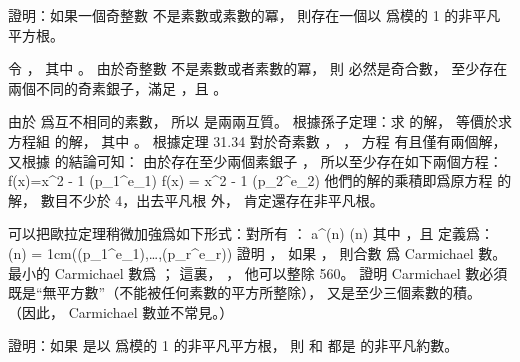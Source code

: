 \startsection[
  title={Primality testing},
]

\startEXERCISE
證明：如果一個奇整數  不是素數或素數的冪，
則存在一個以  爲模的 1 的非平凡平方根。
\stopEXERCISE

\startANSWER
令 ，
其中 。
由於奇整數  不是素數或者素數的冪，
則  必然是奇合數，
至少存在兩個不同的奇素銀子，滿足 ，且 。

由於  爲互不相同的素數，
所以  是兩兩互質。
根據孫子定理：求  的解，
等價於求方程組  的解，
其中 。
根據定理 31.34 對於奇素數 ， ，
方程  有且僅有兩個解，
又根據 的結論可知：
由於存在至少兩個素銀子 ，
所以至少存在如下兩個方程：
\startformula
f(x)=x^2 - 1  (\mod p_1^{e_1})
\stopformula
\startformula
f(x) = x^2 - 1  (\mod p_2^{e_2})
\stopformula
他們的解的乘積即爲原方程  的解，
數目不少於 4，出去平凡根  外，
肯定還存在非平凡根。
\stopANSWER

\startEXERCISE
可以把歐拉定理稍微加強爲如下形式：對所有 ：
\startformula
a^{\lambda(n)}  (\mod n)
\stopformula
其中 ，且  定義爲：
\startformula
\lambda(n) = 1cm(\phi(p_1^{e_1}),\ldots,\phi(p_r^{e_r}))
\stopformula
證明 ，
如果 ，
則合數  爲 Carmichael 數。
最小的 Carmichael 數爲 ；
這裏， ，
他可以整除 560。
證明 Carmichael 數必須既是“無平方數”（不能被任何素數的平方所整除），
又是至少三個素數的積。
（因此， Carmichael 數並不常見。）
\stopEXERCISE

\startANSWER
{}
\stopANSWER

\startEXERCISE
證明：如果  是以  爲模的 1 的非平凡平方根，
則  和  都是  的非平凡約數。
\stopEXERCISE

\startANSWER
{}
\stopANSWER

\stopsection
